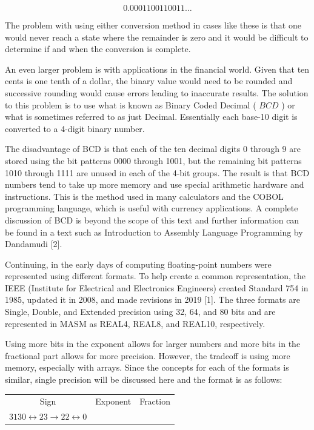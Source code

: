 \documentclass[10pt]{article}
\begin{document}
$$
0.0001100110011 \ldots
$$

The problem with using either conversion method in cases like these is that one would never reach a state where the remainder is zero and it would be difficult to determine if and when the conversion is complete.

An even larger problem is with applications in the financial world. Given that ten cents is one tenth of a dollar, the binary value would need to be rounded and successive rounding would cause errors leading to inaccurate results. The solution to this problem is to use what is known as Binary Coded Decimal ( $B C D$ ) or what is sometimes referred to as just Decimal. Essentially each base-10 digit is converted to a 4-digit binary number.

The disadvantage of BCD is that each of the ten decimal digits 0 through 9 are stored using the bit patterns 0000 through 1001, but the remaining bit patterns 1010 through 1111 are unused in each of the 4-bit groups. The result is that BCD numbers tend to take up more memory and use special arithmetic hardware and instructions. This is the method used in many calculators and the COBOL programming language, which is useful with currency applications. A complete discussion of BCD is beyond the scope of this text and further information can be found in a text such as Introduction to Assembly Language Programming by Dandamudi [2].

Continuing, in the early days of computing floating-point numbers were represented using different formats. To help create a common representation, the IEEE (Institute for Electrical and Electronics Engineers) created Standard 754 in 1985, updated it in 2008, and made revisions in 2019 [1]. The three formats are Single, Double, and Extended precision using 32, 64, and 80 bits and are represented in MASM as REAL4, REAL8, and REAL10, respectively.

Using more bits in the exponent allows for larger numbers and more bits in the fractional part allows for more precision. However, the tradeoff is using more memory, especially with arrays. Since the concepts for each of the formats is similar, single precision will be discussed here and the format is as follows:

\begin{center}
\begin{tabular}{c|c|c|}
\hline
Sign & Exponent & Fraction \\
$3130 \longleftrightarrow 23 \longrightarrow 22 \longleftrightarrow 0$ &  &  \\
\end{tabular}
\end{center}
\end{document}

